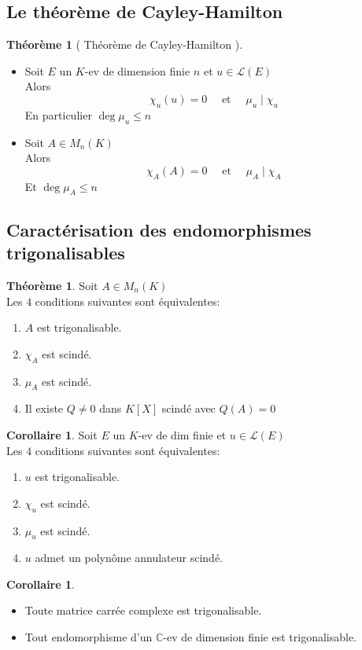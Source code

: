 \documentclass[10pt,a4paper]{article}
\theoremstyle{definition}
\newtheorem{theorem}[proposition]{Théorème}
\newtheorem{corollaire}[proposition]{Corollaire}
\begin{document}
\subsection{Le théorème de Cayley-Hamilton}
\begin{theorem} [ Théorème de Cayley-Hamilton ]
\hfill \begin{itemize}
\item Soit $E$ un $K$-ev de dimension finie $n$ et $u \in \mathcal{L}(E)$ \\
Alors
\[ \boxed{\chi_u(u) = 0} \quad \text{ et } \quad \boxed{\mu_u \mid \chi_u} \]
En particulier $\boxed{\deg \mu_u \leq n}$
\item Soit $A \in M_n(K)$ \\
Alors 
\[ \boxed{\chi_A(A) = 0} \quad \text{ et } \quad \boxed{\mu_A \mid \chi_A} \]
Et $\boxed{\deg \mu_A \leq n}$
\end{itemize}
\end{theorem}

\subsection{Caractérisation des endomorphismes trigonalisables}
\renewcommand{\labelenumi}{(\roman{enumi})}
\begin{theorem}
Soit $A \in M_n(K)$ \\
Les $4$ conditions suivantes sont équivalentes:
\begin{enumerate}
\item $A$ est trigonalisable.
\item $\chi_A$ est scindé.
\item $\mu_A$ est scindé.
\item Il existe $Q \neq 0$ dans $K[X]$ scindé avec $Q(A) = 0$
\end{enumerate}
\end{theorem}
\begin{corollaire}
Soit $E$ un $K$-ev de dim finie et $u \in \mathcal{L}(E)$ \\
Les $4$ conditions suivantes sont équivalentes:
\begin{enumerate}
\item $u$ est trigonalisable.
\item $\chi_u$ est scindé.
\item $\mu_u$ est scindé.
\item $u$ admet un polynôme annulateur scindé.
\end{enumerate}
\end{corollaire}
\begin{corollaire}
\hfill \begin{itemize}
\item Toute matrice carrée complexe est trigonalisable.
\item Tout endomorphisme d'un $\mathbb{C}$-ev de dimension finie est trigonalisable.
\end{itemize}
\end{corollaire}
\end{document}
